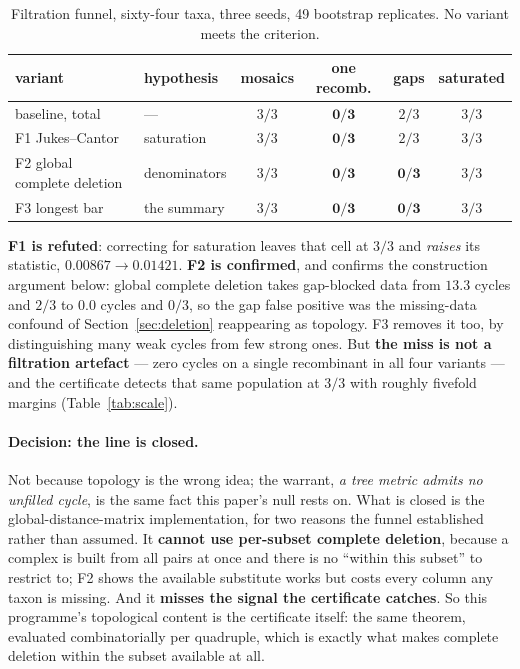 \documentclass[11pt,a4paper]{article}
\theoremstyle{definition}
\theoremstyle{remark}
\begin{document}
\begin{table}[h]
\centering\footnotesize
\caption{Filtration funnel, sixty-four taxa, three seeds, 49 bootstrap
replicates. No variant meets the criterion.}
\label{tab:funnel}
\begin{tabular}{@{}llcccc@{}}
\toprule
variant & hypothesis & mosaics & one recomb. & gaps & saturated \\
\midrule
baseline, total & --- & $3/3$ & $\mathbf{0/3}$ & $2/3$ & $3/3$ \\
F1 Jukes--Cantor & saturation & $3/3$ & $\mathbf{0/3}$ & $2/3$ & $3/3$ \\
F2 global complete deletion & denominators & $3/3$ & $\mathbf{0/3}$ & $\mathbf{0/3}$ & $3/3$ \\
F3 longest bar & the summary & $3/3$ & $\mathbf{0/3}$ & $\mathbf{0/3}$ & $3/3$ \\
\bottomrule
\end{tabular}
\end{table}

\textbf{F1 is refuted}: correcting for saturation leaves that cell at $3/3$ and
\emph{raises} its statistic, $0.00867 \to 0.01421$. \textbf{F2 is confirmed}, and
confirms the construction argument below: global complete deletion takes
gap-blocked data from $13.3$ cycles and $2/3$ to $0.0$ cycles and $0/3$, so the
gap false positive was the missing-data confound of Section~\ref{sec:deletion}
reappearing as topology. F3 removes it too, by distinguishing many weak cycles
from few strong ones. But \textbf{the miss is not a filtration artefact} --- zero
cycles on a single recombinant in all four variants --- and the certificate
detects that same population at $3/3$ with roughly fivefold margins
(Table~\ref{tab:scale}).

\paragraph{Decision: the line is closed.} Not because topology is the wrong
idea; the warrant, \emph{a tree metric admits no unfilled cycle}, is the same
fact this paper's null rests on. What is closed is the
global-distance-matrix implementation, for two reasons the funnel established
rather than assumed. It \textbf{cannot use per-subset complete deletion}, because
a complex is built from all pairs at once and there is no ``within this subset''
to restrict to; F2 shows the available substitute works but costs every column
any taxon is missing. And it \textbf{misses the signal the certificate catches}.
So this programme's topological content is the certificate itself: the same
theorem, evaluated combinatorially per quadruple, which is exactly what makes
complete deletion within the subset available at all.
\end{document}
